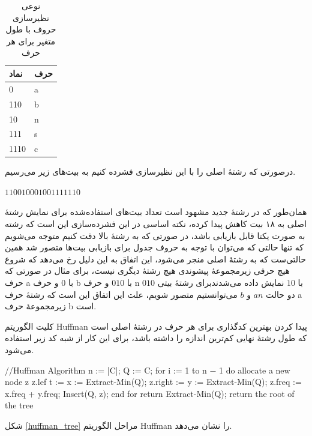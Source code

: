 \begin{table}[h]
        \centering
        \caption{نوعی نظیرسازی حروف با طول متغیر برای هر حرف}
        \label{huffman}
        \begin{tabular}{ll}
        \hline
        نماد & حرف \\ \hline
        0 & a \\
        110 & b \\
        10 & n \\
        111 & s \\
        1110 & c \\ \hline
        \end{tabular}
\end{table}

درصورتی که رشتهٔ اصلی را با این نظیرسازی فشرده کنیم به بیت‌های زیر می‌رسیم.

\begin{center}
        $110010001001111110$
\end{center}

همان‌طور که در رشتهٔ جدید مشهود است تعداد بیت‌های استفاده‌شده برای نمایش
رشتهٔ اصلی به ۱۸ بیت کاهش پیدا کرده، نکته اساسی در این فشرده‌سازی 
این است که رشته به صورت یکتا قابل بازیابی باشد، در صورتی که به رشتهٔ بالا
دقت کنیم متوجه می‌شویم که تنها حالتی که می‌توان با توجه به حروف جدول برای
بازیابی بیت‌ها متصور شد همین حالتی‌ست که به رشتهٔ اصلی منجر می‌شود، این اتفاق به این دلیل
رخ می‌دهد که شروع هیچ حرفی زیرمجموعهٔ پیشوندی هیچ رشتهٔ دیگری نیست، 
برای مثال در صورتی که حرف a با 
$0$ 
و حرف b
با 
$010$ 
و حرف 
n 
با 
$10$ 
نمایش داده می‌شدندبرای رشتهٔ بیتی 
$010$
دو حالت
$an$
و 
$b$
می‌توانستیم متصور شویم، علت این اتفاق این است که رشتهٔ حرف 
a 
زیرمجموعهٔ حرف 
b
است. 

کلیت الگوریتم Huffman پیدا کردن بهترین کدگذاری برای هر حرف در رشتهٔ اصلی 
است که طول رشتهٔ نهایی کم‌ترین اندازه را داشته باشد، برای این کار از شبه کد زیر استفاده می‌شود.
\vspace{5mm}

\begin{code}
//Huffman Algorithm
n := |C|;
Q := C;
for i := 1 to n − 1 do
        allocate a new node z
        z.lef t := x := Extract-Min(Q);
        z.right := y := Extract-Min(Q);
        z.freq := x.freq + y.freq;
        Insert(Q, z);
end for
return Extract-Min(Q); {return the root of the tree}
\end{code}
\vspace{5mm}
شکل 
\ref{huffman_tree}
مراحل الگوریتم Huffman را نشان می‌دهد.

